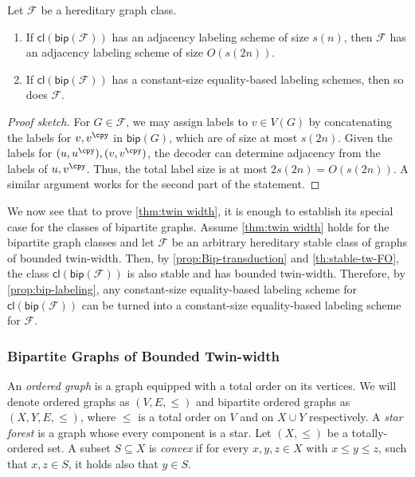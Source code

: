 \documentclass{theoretics}
\newcommand{\cF}{\ensuremath{\mathcal{F}}}
\newcommand{\bip}{\mathsf{bip}}
\newcommand{\cl}{\mathsf{cl}}
\begin{document}
\begin{proposition}
\label{prop:bip-labeling}
Let $\cF$ be a hereditary graph class. 
\begin{enumerate}
	\item[(1)] If $\cl(\bip(\cF))$ has an adjacency labeling scheme of
	size $s(n)$, then $\cF$ has an adjacency labeling scheme of size $O(s(2n))$. 
	\item[(2)] If $\cl(\bip(\cF))$ has a constant-size equality-based labeling schemes, then so does $\cF$.
\end{enumerate}
\end{proposition}
\begin{proof}[Proof sketch]
For $G \in \cF$, we may assign labels to $v \in V(G)$ by concatenating the labels for $v, v^\cpy$
in $\bip(G)$, which are of size at most $s(2n)$. Given the labels for $(u, u^\cpy), (v, v^\cpy)$,
the decoder can determine adjacency from the labels of $u, v^\cpy$. 
Thus, the total label size is at most $2s(2n) = O(s(2n))$.
A similar argument works for the second part of the statement.
\end{proof}

We now see that to prove \cref{thm:twin width}, it is enough to establish its special case for the classes of
bipartite graphs.  Assume \cref{thm:twin width} holds for the bipartite graph classes and let $\cF$ be
an arbitrary hereditary stable class of graphs of bounded twin-width.  Then, by
\cref{prop:Bip-transduction} and \cref{th:stable-tw-FO}, the class $\cl(\bip(\cF))$ is also stable
and has bounded twin-width.  Therefore, by \cref{prop:bip-labeling}, any constant-size equality-based
labeling scheme for $\cl(\bip(\cF))$ can be turned into a constant-size equality-based labeling
scheme for $\cF$.



\subsubsection{Bipartite Graphs of Bounded Twin-width}\label{sec:bip-graphs}

An \emph{ordered graph} is a graph equipped with a total order on its vertices. We will denote
ordered graphs as $(V,E,\leq)$ and bipartite ordered graphs  as $ (X,Y,E,\leq)$, where $\leq$ 
is a total order on $V$ and on $X \cup Y$ respectively.
A \emph{star forest} is a graph whose every component is a star.
Let $(X,\leq)$ be a totally-ordered set. A subset $S \subseteq X$ is
\emph{convex} if for every $x,y,z\in X$ with $x \leq y \leq z$, such that $x,z \in S$, it holds also that $y \in S$.
\end{document}
